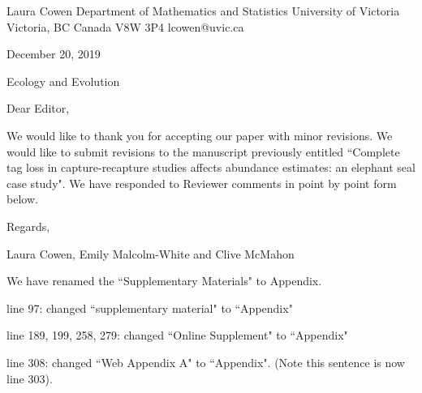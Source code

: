 \documentclass[12pt]{article}
\begin{document}
\noindent Laura Cowen \newline
\noindent Department of Mathematics and Statistics \newline
\noindent University of Victoria \newline
\noindent Victoria, BC \newline
\noindent Canada V8W 3P4 \newline
\noindent lcowen@uvic.ca \newline

\bigskip

\bigskip

\noindent \normalsize December 20, 2019
\bigskip





\noindent Ecology and Evolution


\bigskip


\bigskip
\noindent Dear Editor,

\bigskip

We would like to thank you for accepting our paper with minor revisions. We would like to submit revisions to the manuscript previously entitled ``Complete tag loss in capture-recapture studies affects abundance estimates: an elephant seal case study".  We have responded to Reviewer comments in point by point form below. 

\bigskip

Regards,

\bigskip


Laura Cowen, Emily Malcolm-White and Clive McMahon


\newpage

\bigskip



\noindent We have renamed the ``Supplementary Materials" to Appendix. 

line 97: changed ``supplementary material" to ``Appendix"

line 189, 199, 258, 279: changed ``Online Supplement" to ``Appendix"

line 308: changed ``Web Appendix A" to ``Appendix". (Note this sentence is now line 303).
 

\bigskip
\end{document}
